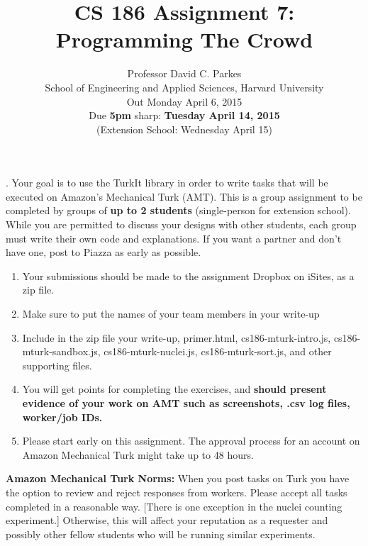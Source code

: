 \documentclass[11pt]{article}
\begin{document}
\title{CS 186 Assignment 7:\\
Programming The Crowd}
\author{Professor David C. Parkes \\School of Engineering and Applied Sciences, Harvard University\\
Out Monday April 6, 2015\\
Due {\bf 5pm} sharp: {\bf Tuesday April 14, 2015}\\
(Extension School: Wednesday April 15)
}
\date{}

\maketitle

. Your goal is to use the TurkIt library in order to 
write tasks that will be executed on Amazon's Mechanical Turk (AMT). This is a group assignment to be completed
by groups of \textbf{up to 2 students} (single-person for extension school). 
While you are permitted to discuss your designs with other students, each group must write their own code and explanations.
If you want a partner and don't have one, post to Piazza as early as possible. 
\\

\begin{enumerate}
\item Your submissions should be made to the assignment Dropbox on iSites,
as a zip file.
\item Make sure to put the names of your team members in your write-up
\item Include in the zip file your write-up, primer.html, cs186-mturk-intro.js, cs186-mturk-sandbox.js, cs186-mturk-nuclei.js, cs186-mturk-sort.js, and other supporting files.

\item You will get
points for completing the exercises, and {\bf should present evidence of your work
on AMT such as screenshots, .csv log files, worker/job IDs.}

\item Please start early on this assignment. The approval process for an account on Amazon Mechanical Turk might take up to 48 hours. 

\end{enumerate} 

\smallskip

\textbf{Amazon Mechanical Turk Norms:} When you post tasks on Turk you
have the option to review and reject responses from workers. Please
accept all tasks completed in a reasonable way. [There is one
exception in the nuclei counting experiment.] Otherwise, this will
affect your reputation as a requester and possibly other fellow
students who will be running similar experiments.
\end{document}

